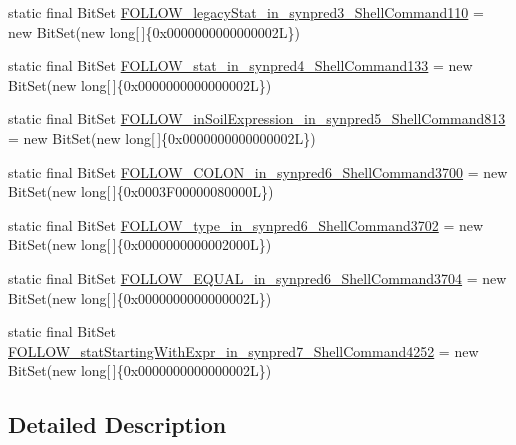 \begin{DoxyCompactItemize}
\item 
static final Bit\-Set \hyperlink{classorg_1_1tzi_1_1use_1_1parser_1_1shell_1_1_shell_command_parser_a6c830b1b017eff8680f07ac9f483b639}{F\-O\-L\-L\-O\-W\-\_\-legacy\-Stat\-\_\-in\-\_\-synpred3\-\_\-\-Shell\-Command110} = new Bit\-Set(new long\mbox{[}$\,$\mbox{]}\{0x0000000000000002\-L\})
\item 
static final Bit\-Set \hyperlink{classorg_1_1tzi_1_1use_1_1parser_1_1shell_1_1_shell_command_parser_a52408bedcffdc8adcb7bf0e31dccf0bd}{F\-O\-L\-L\-O\-W\-\_\-stat\-\_\-in\-\_\-synpred4\-\_\-\-Shell\-Command133} = new Bit\-Set(new long\mbox{[}$\,$\mbox{]}\{0x0000000000000002\-L\})
\item 
static final Bit\-Set \hyperlink{classorg_1_1tzi_1_1use_1_1parser_1_1shell_1_1_shell_command_parser_ad90dcf0d6b5aa75027dd4ca8e54ca7d8}{F\-O\-L\-L\-O\-W\-\_\-in\-Soil\-Expression\-\_\-in\-\_\-synpred5\-\_\-\-Shell\-Command813} = new Bit\-Set(new long\mbox{[}$\,$\mbox{]}\{0x0000000000000002\-L\})
\item 
static final Bit\-Set \hyperlink{classorg_1_1tzi_1_1use_1_1parser_1_1shell_1_1_shell_command_parser_a09fff7dd8105dd3f343def059e5f32b2}{F\-O\-L\-L\-O\-W\-\_\-\-C\-O\-L\-O\-N\-\_\-in\-\_\-synpred6\-\_\-\-Shell\-Command3700} = new Bit\-Set(new long\mbox{[}$\,$\mbox{]}\{0x0003\-F00000080000\-L\})
\item 
static final Bit\-Set \hyperlink{classorg_1_1tzi_1_1use_1_1parser_1_1shell_1_1_shell_command_parser_a12b8aa4ba9b11da36d130b6a5269a911}{F\-O\-L\-L\-O\-W\-\_\-type\-\_\-in\-\_\-synpred6\-\_\-\-Shell\-Command3702} = new Bit\-Set(new long\mbox{[}$\,$\mbox{]}\{0x0000000000002000\-L\})
\item 
static final Bit\-Set \hyperlink{classorg_1_1tzi_1_1use_1_1parser_1_1shell_1_1_shell_command_parser_a14e8429b4f67c22709b48b52d1bbeaf2}{F\-O\-L\-L\-O\-W\-\_\-\-E\-Q\-U\-A\-L\-\_\-in\-\_\-synpred6\-\_\-\-Shell\-Command3704} = new Bit\-Set(new long\mbox{[}$\,$\mbox{]}\{0x0000000000000002\-L\})
\item 
static final Bit\-Set \hyperlink{classorg_1_1tzi_1_1use_1_1parser_1_1shell_1_1_shell_command_parser_abfe3b2e5ab5b8f05af476604fa7d7b98}{F\-O\-L\-L\-O\-W\-\_\-stat\-Starting\-With\-Expr\-\_\-in\-\_\-synpred7\-\_\-\-Shell\-Command4252} = new Bit\-Set(new long\mbox{[}$\,$\mbox{]}\{0x0000000000000002\-L\})
\end{DoxyCompactItemize}


\subsection{Detailed Description}


